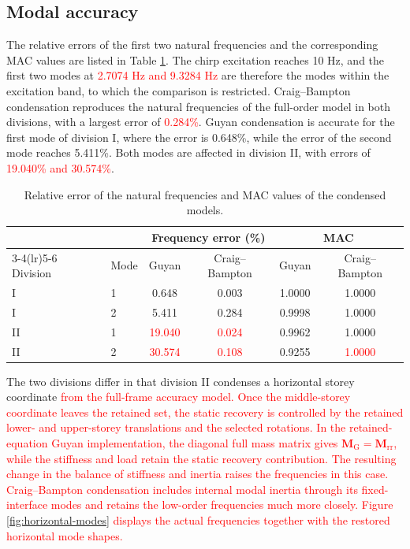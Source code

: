 \documentclass[a4paper,fleqn,review,12pt]{cas-sc}
\numberwithin{equation}{section}
\newcommand{\rev}[1]{\textcolor{red}{#1}}
\begin{document}
\subsection{Modal accuracy}
\label{sec:modal-accuracy}

The relative errors of the first two natural frequencies and the corresponding MAC values are listed in Table \ref{tab:modal}. The chirp excitation reaches 10 Hz, and the first two modes at \rev{2.7074 Hz and 9.3284 Hz} are therefore the modes within the excitation band, to which the comparison is restricted. Craig--Bampton condensation reproduces the natural frequencies of the full-order model in both divisions, with a largest error of \rev{0.284\%}. Guyan condensation is accurate for the first mode of division I, where the error is 0.648\%, while the error of the second mode reaches 5.411\%. Both modes are affected in division II, with errors of \rev{19.040\% and 30.574\%}.

\begin{table}[htbp]
	\centering
	\caption{Relative error of the natural frequencies and MAC values of the condensed models.}
	\label{tab:modal}
	\begin{tabular}{llcccc}
		\toprule
		& & \multicolumn{2}{c}{Frequency error (\%)} & \multicolumn{2}{c}{MAC}\\
		\cmidrule(lr){3-4}\cmidrule(lr){5-6}
		Division & Mode & Guyan & Craig--Bampton & Guyan & Craig--Bampton\\
		\midrule
		I  & 1 & 0.648  & 0.003 & 1.0000 & 1.0000\\
		I  & 2 & 5.411  & 0.284 & 0.9998 & 1.0000\\
		\midrule
		II & 1 & \rev{19.040} & \rev{0.024} & 0.9962 & 1.0000\\
		II & 2 & \rev{30.574} & \rev{0.108} & 0.9255 & \rev{1.0000}\\
		\bottomrule
	\end{tabular}
\end{table}

The two divisions differ in that division II condenses a horizontal storey coordinate \rev{from the full-frame accuracy model. Once the middle-storey coordinate leaves the retained set, the static recovery is controlled by the retained lower- and upper-storey translations and the selected rotations. In the retained-equation Guyan implementation, the diagonal full mass matrix gives \(\mathbf M_{\mathrm G}=\mathbf M_{\mathrm{rr}}\), while the stiffness and load retain the static recovery contribution. The resulting change in the balance of stiffness and inertia raises the frequencies in this case. Craig--Bampton condensation includes internal modal inertia through its fixed-interface modes and retains the low-order frequencies much more closely. Figure \ref{fig:horizontal-modes} displays the actual frequencies together with the restored horizontal mode shapes.}
\end{document}
